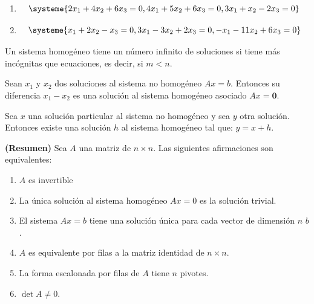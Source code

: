 \begin{ejem}
\begin{enumerate}
\item
\begin{equation*}
\systeme{
2x_1 + 4x_2 + 6x_3 = 0,
4x_1 + 5x_2 + 6x_3 = 0,
3x_1 + x_2 - 2x_3 = 0
}
\end{equation*}

\item
\begin{equation*}
\systeme{
x_1 + 2x_2 - x_3 = 0,
3x_1 - 3x_2 + 2x_3 = 0,
-x_1 - 11x_2 + 6x_3 = 0
}
\end{equation*}
\end{enumerate}
\end{ejem}


\begin{thm}
Un sistema homogéneo tiene un número infinito de soluciones si tiene más incógnitas que ecuaciones, es decir, si $m < n$.
\end{thm}

\begin{thm}
Sean $x_1$ y $x_2$ dos soluciones al sistema no homogéneo $Ax=b$. Entonces su diferencia $x_1-x_2$ es una solución al sistema homogéneo asociado $Ax= \textbf{0}$.
\end{thm}

\begin{cor}
Sea $x$ una solución particular al sistema no homogéneo y sea $y$ otra solución. Entonces existe una solución $h$ al sistema homogéneo tal que: $y = x + h$.
\end{cor}


\begin{thm}
\textbf{(Resumen)} Sea $A$ una matriz de $n \times n$. Las siguientes afirmaciones son equivalentes:

\begin{enumerate}
\item
$A$ es invertible

\item
La única solución al sistema homogéneo $Ax = 0$ es la solución trivial.

\item
El sistema $Ax = b$ tiene una solución única para cada vector de dimensión $n$ $b$.

\item
$A$ es equivalente por filas a la matriz identidad de $n \times n$.

\item
La forma escalonada por filas de $A$ tiene $n$ pivotes.

\item
$\det A \not = 0$.
\end{enumerate}
\end{thm}

